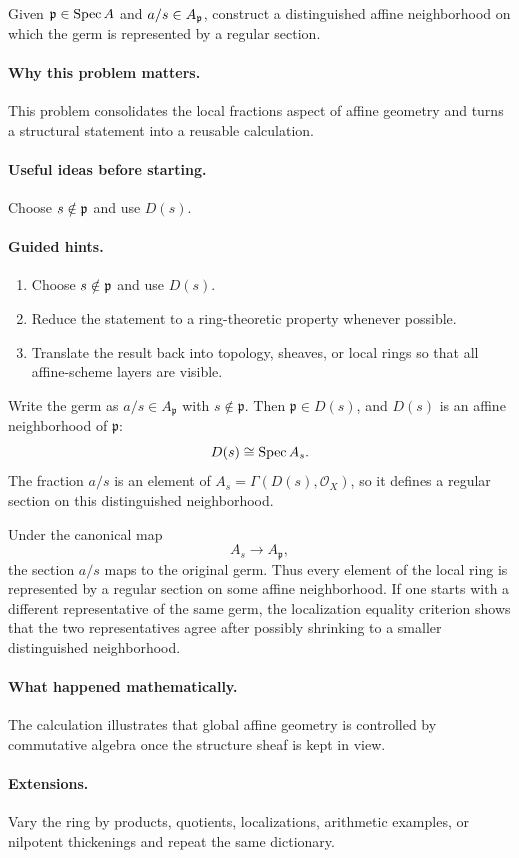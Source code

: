 \begin{problem}\label{prob:vi18-p15}
Given $\mathfrak p\in\operatorname{Spec} A$ and $a/s\in A_{\mathfrak p}$, construct a distinguished affine neighborhood on which the germ is represented by a regular section.
\end{problem}

\ifdefined\FullProblemDossiers
\paragraph{Why this problem matters.}
This problem consolidates the local fractions aspect of affine geometry and turns a structural statement into a reusable calculation.

\paragraph{Useful ideas before starting.}
Choose $s\notin\mathfrak p$ and use $D(s)$.

\paragraph{Guided hints.}
\begin{enumerate}
\item Choose $s\notin\mathfrak p$ and use $D(s)$.
\item Reduce the statement to a ring-theoretic property whenever possible.
\item Translate the result back into topology, sheaves, or local rings so that all affine-scheme layers are visible.
\end{enumerate}

\begin{solution}
Write the germ as $a/s\in A_{\mathfrak p}$ with $s\notin\mathfrak p$. Then $\mathfrak p\in D(s)$, and $D(s)$ is an affine neighborhood of $\mathfrak p$:
\[
D(s)\cong\operatorname{Spec} A_s.
\]
The fraction $a/s$ is an element of $A_s=\Gamma(D(s),\mathcal O_X)$, so it defines a regular section on this distinguished neighborhood.

Under the canonical map
\[
A_s\longrightarrow A_{\mathfrak p},
\]
the section $a/s$ maps to the original germ. Thus every element of the local ring is represented by a regular section on some affine neighborhood. If one starts with a different representative of the same germ, the localization equality criterion shows that the two representatives agree after possibly shrinking to a smaller distinguished neighborhood.
\end{solution}


\paragraph{What happened mathematically.}
The calculation illustrates that global affine geometry is controlled by commutative algebra once the structure sheaf is kept in view.

\paragraph{Extensions.}
Vary the ring by products, quotients, localizations, arithmetic examples, or nilpotent thickenings and repeat the same dictionary.
\fi
